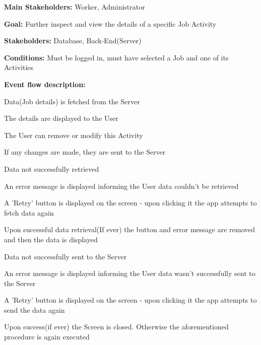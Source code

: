 			\noindent {}
			\begin{packed_item}
				\item \textbf{Main Stakeholders:} Worker, Administrator
				\item \textbf{Goal:} Further inspect and view the details of a specific Job Activity
				\item \textbf{Stakeholders: } Database, Back-End(Server)
				\item \textbf{Conditions: } Must be logged in, must have selected a Job and one of its Activities
				\item \textbf{Event flow description: }
				\begin{packed_enum}
					\item Data(Job details) is fetched from the Server
					\item The details are displayed to the User
					\item The User can remove or modify this Activity
					\item If any changes are made, they are sent to the Server
				\end{packed_enum}
				
				\begin{packed_item}
					\item[1.a] Data not successfully retrieved
					\item[] \begin{packed_enum}
						\item An error message is displayed informing the User data couldn't be retrieved
						\item A 'Retry' button is displayed on the screen - upon clicking it the app attempts to fetch data again
						\item Upon successful data retrieval(If ever) the button and error message are removed and then the data is displayed
					\end{packed_enum}
				
					\item[3.a] Data not successfully sent to the Server
					\item[] \begin{packed_enum}
						\item An error message is displayed informing the User data wasn't successfully sent to the Server
						\item A 'Retry' button is displayed on the screen - upon clicking it the app attempts to send the data again
						\item Upon success(if ever) the Screen is closed. Otherwise the aforementioned procedure is again executed
					\end{packed_enum}
				\end{packed_item}
			\end{packed_item}

